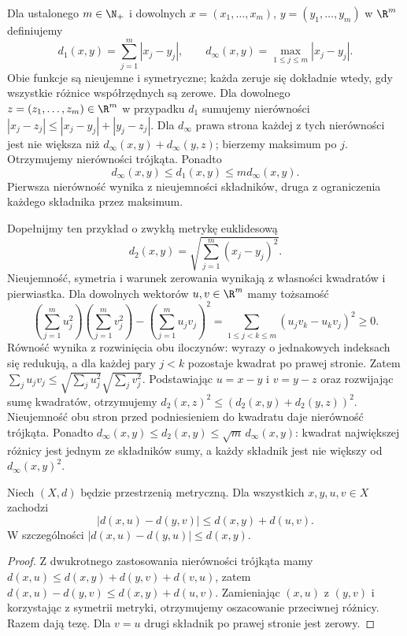 \begin{przyklad}
\label{ma1:ex:vector-metrics}
Dla ustalonego $m\in\N_+$ i dowolnych $x=(x_1,\ldots,x_m)$, $y=(y_1,\ldots,y_m)$ w $\R^m$ definiujemy
\[
 d_1(x,y)=\sum_{j=1}^m|x_j-y_j|,\qquad
 d_\infty(x,y)=\max_{1\le j\le m}|x_j-y_j|.
\]
Obie funkcje są nieujemne i symetryczne; każda zeruje się dokładnie wtedy, gdy wszystkie różnice współrzędnych są zerowe. Dla dowolnego $z=(z_1,\ldots,z_m)\in\R^m$ w przypadku $d_1$ sumujemy nierówności $|x_j-z_j|\le |x_j-y_j|+|y_j-z_j|$. Dla $d_\infty$ prawa strona każdej z tych nierówności jest nie większa niż $d_\infty(x,y)+d_\infty(y,z)$; bierzemy maksimum po $j$. Otrzymujemy nierówności trójkąta. Ponadto
\[
 d_\infty(x,y)\le d_1(x,y)\le m d_\infty(x,y).
\]
Pierwsza nierówność wynika z nieujemności składników, druga z ograniczenia każdego składnika przez maksimum.

Dopełnijmy ten przykład o zwykłą metrykę euklidesową
\[
 d_2(x,y)=\sqrt{\sum_{j=1}^m(x_j-y_j)^2}.
\]
Nieujemność, symetria i warunek zerowania wynikają z własności kwadratów i pierwiastka. Dla dowolnych wektorów $u,v\in\R^m$ mamy tożsamość
\[
 \left(\sum_{j=1}^m u_j^2\right)\left(\sum_{j=1}^m v_j^2\right)
 -\left(\sum_{j=1}^m u_jv_j\right)^2
 =\sum_{1\le j<k\le m}(u_jv_k-u_kv_j)^2\ge0.
\]
Równość wynika z rozwinięcia obu iloczynów: wyrazy o jednakowych indeksach się redukują, a dla każdej pary $j<k$ pozostaje kwadrat po prawej stronie. Zatem $\sum_j u_jv_j\le\sqrt{\sum_j u_j^2}\sqrt{\sum_j v_j^2}$. Podstawiając $u=x-y$ i $v=y-z$ oraz rozwijając sumę kwadratów, otrzymujemy $d_2(x,z)^2\le(d_2(x,y)+d_2(y,z))^2$. Nieujemność obu stron przed podniesieniem do kwadratu daje nierówność trójkąta.
Ponadto $d_\infty(x,y)\le d_2(x,y)\le\sqrt m\,d_\infty(x,y)$: kwadrat największej różnicy jest jednym ze składników sumy, a każdy składnik jest nie większy od $d_\infty(x,y)^2$.
\end{przyklad}

\begin{lemat}
\label{ma1:lem:distance-estimates}
Niech $(X,d)$ będzie przestrzenią metryczną. Dla wszystkich $x,y,u,v\in X$ zachodzi
\[
 |d(x,u)-d(y,v)|\le d(x,y)+d(u,v).
\]
W szczególności $|d(x,u)-d(y,u)|\le d(x,y)$.
\end{lemat}
\begin{proof}
Z dwukrotnego zastosowania nierówności trójkąta mamy $d(x,u)\le d(x,y)+d(y,v)+d(v,u)$, zatem $d(x,u)-d(y,v)\le d(x,y)+d(u,v)$. Zamieniając $(x,u)$ z $(y,v)$ i korzystając z symetrii metryki, otrzymujemy oszacowanie przeciwnej różnicy. Razem dają tezę. Dla $v=u$ drugi składnik po prawej stronie jest zerowy.
\end{proof}

